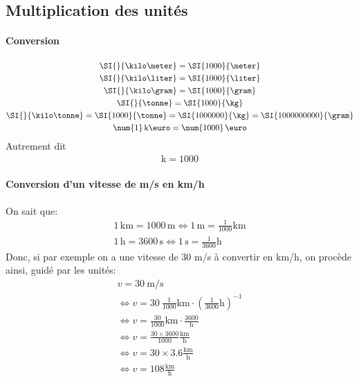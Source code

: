 \subsection{Multiplication des unités}
\paragraph{Conversion}
\begin{gather*}  
    \SI{}{\kilo\meter} = \SI{1000}{\meter} \\
    \SI{}{\kilo\liter} = \SI{1000}{\liter} \\
    \SI{}{\kilo\gram} = \SI{1000}{\gram} \\
    \SI{}{\tonne} = \SI{1000}{\kg} \\
    \SI{}{\kilo\tonne} = \SI{1000}{\tonne} = \SI{1000000}{\kg} = \SI{1000000000}{\gram}\\
    \num{1}\,\text{k\euro} = \num{1000}\,\text{\euro}
\end{gather*}
Autrement dit
\begin{gather*}  
    \text{k} = \num{1000}
\end{gather*}

\paragraph{Conversion d'un vitesse de m/s en km/h}
On sait que:
\begin{gather*}
        \mathrm{1\,km = 1000\,m \iff 1\,m = \frac{1}{1000}km} \\
        \mathrm{1\,h = 3600\,s \iff 1\,s = \frac{1}{3600}h}
\end{gather*}
Donc, si par exemple on a une vitesse de 30 m/s à convertir en km/h, on procède ainsi, guidé par les unités:
{\setlength{\jot}{10pt}
\begin{gather*}
        v = \SI{30}{\meter\per\second} \\
        \iff v = \num{30}\ \frac{1}{1000}\mathrm{km} \cdot \left(\frac{1}{3600}\mathrm{h}\right)^{-1}\\
        \iff v = \frac{\num{30}}{1000}\mathrm{km} \cdot \frac{3600}{\mathrm{h}}\\
        \iff v = \frac{\num{30} \times 3600}{1000}\frac{\mathrm{km}}{\mathrm{h}}\\
        \iff v = \num{30} \times \num{3.6}\frac{\mathrm{km}}{\mathrm{h}}\\
        \iff \boxed{v = \mathrm{\num{108}\frac{km}{h}}}
\end{gather*}}


